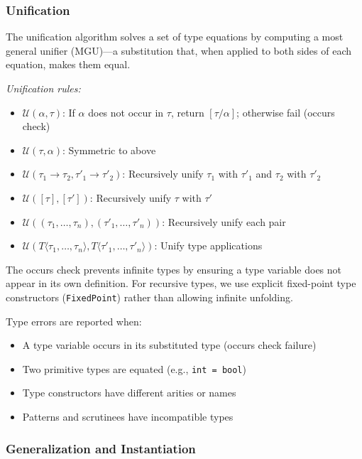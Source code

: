 \documentclass[conference,onecolumn]{IEEEtran}
\begin{document}
\subsubsection{Unification}

The unification algorithm solves a set of type equations by computing a most general unifier (MGU)—a substitution that, when applied to both sides of each equation, makes them equal.

\textit{Unification rules:}

\begin{itemize}
\item $\mathcal{U}(\alpha, \tau)$: If $\alpha$ does not occur in $\tau$, return $[\tau/\alpha]$; otherwise fail (occurs check)
\item $\mathcal{U}(\tau, \alpha)$: Symmetric to above
\item $\mathcal{U}(\tau_1 \to \tau_2, \tau'_1 \to \tau'_2)$: Recursively unify $\tau_1$ with $\tau'_1$ and $\tau_2$ with $\tau'_2$
\item $\mathcal{U}([\tau], [\tau'])$: Recursively unify $\tau$ with $\tau'$
\item $\mathcal{U}((\tau_1, \ldots, \tau_n), (\tau'_1, \ldots, \tau'_n))$: Recursively unify each pair
\item $\mathcal{U}(T\langle\tau_1, \ldots, \tau_n\rangle, T\langle\tau'_1, \ldots, \tau'_n\rangle)$: Unify type applications
\end{itemize}

The occurs check prevents infinite types by ensuring a type variable does not appear in its own definition. For recursive types, we use explicit fixed-point type constructors (\texttt{FixedPoint}) rather than allowing infinite unfolding.

Type errors are reported when:
\begin{itemize}
\item A type variable occurs in its substituted type (occurs check failure)
\item Two primitive types are equated (e.g., \texttt{int = bool})
\item Type constructors have different arities or names
\item Patterns and scrutinees have incompatible types
\end{itemize}

\subsubsection{Generalization and Instantiation}
\end{document}
